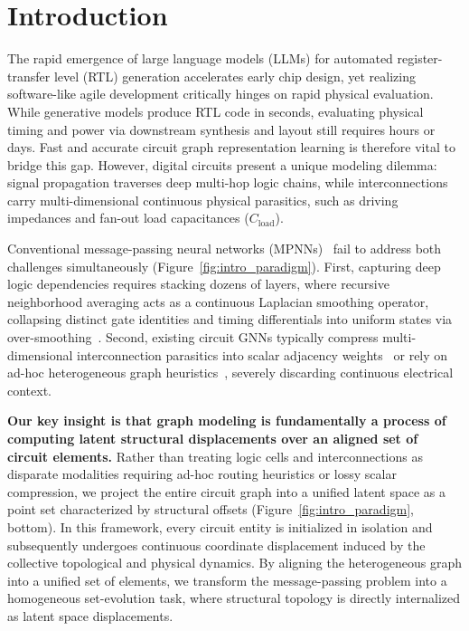 \section{Introduction}
\label{sec:intro}

The rapid emergence of large language models (LLMs) for automated register-transfer level (RTL) generation accelerates early chip design, yet realizing software-like agile development critically hinges on rapid physical evaluation. While generative models produce RTL code in seconds, evaluating physical timing and power via downstream synthesis and layout still requires hours or days. Fast and accurate circuit graph representation learning is therefore vital to bridge this gap. However, digital circuits present a unique modeling dilemma: signal propagation traverses deep multi-hop logic chains, while interconnections carry multi-dimensional continuous physical parasitics, such as driving impedances and fan-out load capacitances ($C_{\text{load}}$).

Conventional message-passing neural networks (MPNNs)~\cite{kipf2017gcn,velickovic2018gat} fail to address both challenges simultaneously (Figure~\ref{fig:intro_paradigm}). First, capturing deep logic dependencies requires stacking dozens of layers, where recursive neighborhood averaging acts as a continuous Laplacian smoothing operator, collapsing distinct gate identities and timing differentials into uniform states via over-smoothing~\cite{rusch2023survey}. Second, existing circuit GNNs typically compress multi-dimensional interconnection parasitics into scalar adjacency weights~\cite{velickovic2018gat,preroutgnn} or rely on ad-hoc heterogeneous graph heuristics~\cite{timingpredict,deepgate2}, severely discarding continuous electrical context.

\textbf{Our key insight is that graph modeling is fundamentally a process of computing latent structural displacements over an aligned set of circuit elements.} Rather than treating logic cells and interconnections as disparate modalities requiring ad-hoc routing heuristics or lossy scalar compression, we project the entire circuit graph into a unified latent space as a point set characterized by structural offsets (Figure~\ref{fig:intro_paradigm}, bottom). In this framework, every circuit entity is initialized in isolation and subsequently undergoes continuous coordinate displacement induced by the collective topological and physical dynamics. By aligning the heterogeneous graph into a unified set of elements, we transform the message-passing problem into a homogeneous set-evolution task, where structural topology is directly internalized as latent space displacements.

